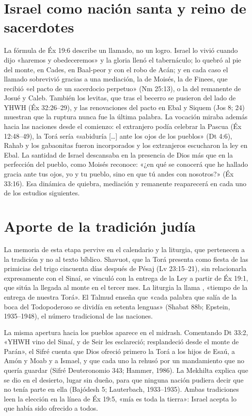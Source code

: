 \section{Israel como nación santa y reino de sacerdotes}

La fórmula de Éx 19:6 describe un llamado, no un logro. Israel lo vivió cuando dijo «haremos y obedeceremos» y la gloria llenó el tabernáculo; lo quebró al pie del monte, en Cades, en Baal-peor y con el robo de Acán; y en cada caso el llamado sobrevivió gracias a una mediación, la de Moisés, la de Finees, que recibió «el pacto de un sacerdocio perpetuo» (Nm 25:13), o la del remanente de Josué y Caleb. También los levitas, que tras el becerro se pusieron del lado de YHWH (Éx 32:26–29), y las renovaciones del pacto en Ebal y Siquem (Jos 8; 24) muestran que la ruptura nunca fue la última palabra. La vocación miraba además hacia las naciones desde el comienzo: el extranjero podía celebrar la Pascua (Éx 12:48–49), la Torá sería «sabiduría [\ldots] ante los ojos de los pueblos» (Dt 4:6), Rahab y los gabaonitas fueron incorporados y los extranjeros escucharon la ley en Ebal. La santidad de Israel descansaba en la presencia de Dios más que en la perfección del pueblo, como Moisés reconoce: «¿en qué se conocerá que he hallado gracia ante tus ojos, yo y tu pueblo, sino en que tú andes con nosotros?» (Éx 33:16). Esa dinámica de quiebra, mediación y remanente reaparecerá en cada uno de los estudios siguientes.

\section{Aporte de la tradición judía}

La memoria de esta etapa pervive en el calendario y la liturgia, que pertenecen a la tradición y no al texto bíblico. Shavuot, que la Torá presenta como fiesta de las primicias del trigo cincuenta días después de Pésaj (Lv 23:15–21), sin relacionarla expresamente con el Sinaí, se vinculó con la entrega de la Ley a partir de Éx 19:1, que sitúa la llegada al monte en el tercer mes. La liturgia la llama , «tiempo de la entrega de nuestra Torá». El Talmud enseña que «cada palabra que salía de la boca del Todopoderoso se dividía en setenta lenguas» (Shabat 88b; Epstein, 1935–1948), el número tradicional de las naciones.

La misma apertura hacia los pueblos aparece en el midrash. Comentando Dt 33:2, «YHWH vino del Sinaí, y de Seir les esclareció; resplandeció desde el monte de Parán», el Sifré cuenta que Dios ofreció primero la Torá a los hijos de Esaú, a Amón y Moab y a Ismael, y que cada uno la rehusó por un mandamiento que no quería guardar (Sifré Deuteronomio 343; Hammer, 1986). La Mekhilta explica que se dio en el desierto, lugar sin dueño, para que ninguna nación pudiera decir que no tenía parte en ella (Bajódesh 5; Lauterbach, 1933–1935). Ambas tradiciones leen la elección en la línea de Éx 19:5, «mía es toda la tierra»: Israel acepta lo que había sido ofrecido a todos.


